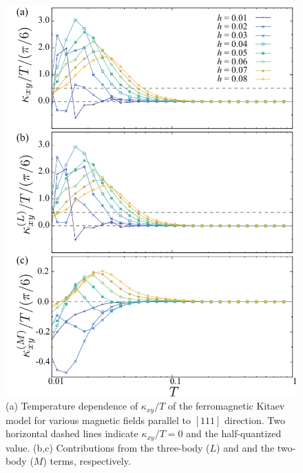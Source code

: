 \documentclass[reprint,amsmath,amssymb,aps,prx]{revtex4-2}
\begin{document}
\begin{figure}
  \begin{center}
    \includegraphics[width=0.9\linewidth]{plot_k_all.pdf}
  \end{center}
  \caption{(a) Temperature dependence of $\kappa_{xy}/T$ of the ferromagnetic Kitaev model for various magnetic fields parallel to $[111]$ direction. Two horizontal dashed lines indicate $\kappa_{xy}/T = 0$ and the half-quantized value. (b,c) Contributions from the three-body ($L$) and and the two-body ($M$) terms, respectively.}
  \label{fig:k_all_pure}
\end{figure}
\end{document}
